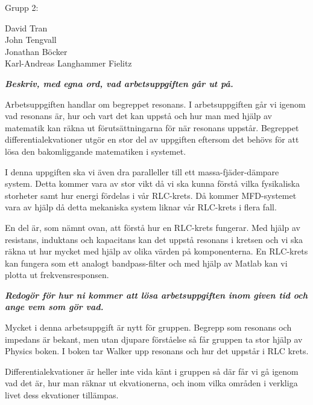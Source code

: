 \documentclass[12pt, a4paper]{report}
\begin{document}
\begin{flushleft}
\begin{large}
Grupp 2:\\
\end{large}

David Tran\\
John Tengvall\\
Jonathan Böcker\\
Karl-Andreas Langhammer Fielitz\newline

\textbf{\textit{
Beskriv, med egna ord, vad arbetsuppgiften går ut på.
}}

Arbetsuppgiften handlar om begreppet resonans.
I arbetsuppgiften går vi igenom vad resonans är, hur och vart det kan uppstå och hur man med hjälp av matematik kan räkna ut förutsättningarna för när resonans uppstår. 
Begreppet differentialekvationer utgör en stor del av uppgiften eftersom det behövs för att lösa den bakomliggande matematiken i systemet. \newline

I denna uppgiften ska vi även dra paralleller till ett massa-fjäder-dämpare system. Detta kommer vara av stor vikt då vi ska kunna förstå vilka fysikaliska storheter samt hur energi fördelas i vår RLC-krets. Då kommer MFD-systemet vara av hjälp då detta mekaniska system liknar vår RLC-krets i flera fall.\newline

En del är, som nämnt ovan, att förstå hur en RLC-krets fungerar. Med hjälp av resistans, induktans och kapacitans kan det uppstå resonans i kretsen och vi ska räkna ut hur mycket med hjälp av olika värden på komponenterna. En RLC-krets kan fungera som ett analogt bandpass-filter och med hjälp av Matlab kan vi plotta ut frekvensresponsen.\newline

\textbf{\textit{
Redogör för hur ni kommer att lösa arbetsuppgiften inom given tid och ange vem som gör vad.
}}

Mycket i denna arbetsuppgift är nytt för gruppen. Begrepp som resonans och impedans är bekant, men utan djupare förståelse så får gruppen ta stor hjälp av Physics boken. I boken tar Walker upp resonans och hur det uppstår i RLC krets.\newline

Differentialekvationer är heller inte vida känt i gruppen så där får vi gå igenom vad det är, hur man räknar ut ekvationerna, och inom vilka områden i verkliga livet dess ekvationer tillämpas.\newline


\end{flushleft}
\end{document}
